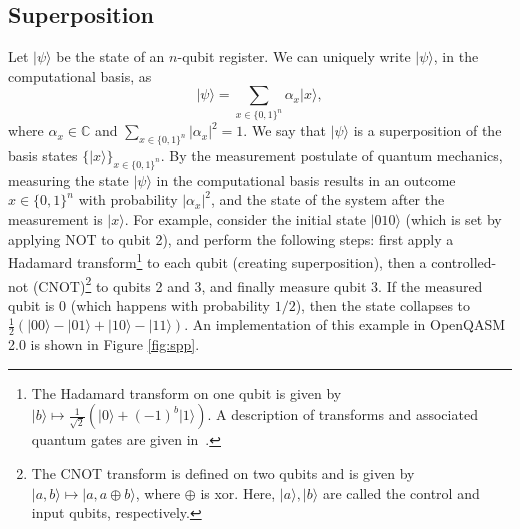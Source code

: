 \documentclass[11pt]{article}
\theoremstyle{plain}
\theoremstyle{definition}
\newcommand{\ldbrac}[1]{\lvert#1\rangle}
\newcommand{\abs}[1]{\left\vert#1\right\vert}
\def\C{\ensuremath{\mathbb{C}}}
\begin{document}
\subsection{Superposition}\label{sec:superposition}

Let $\ldbrac{\psi}$ be the state of an $n$-qubit register. We can uniquely write $\ldbrac{\psi}$, 
in 
the computational basis, as
\[ \ldbrac{\psi} = \sum_{x \in \{ 0, 1 \}^n} \alpha_x \ldbrac{x}, \]
where $\alpha_x \in \C$ and $\sum_{x \in \{ 0, 1 \}^n} \abs{\alpha_x}^2 = 1$. We say that 
$\ldbrac{\psi}$ is a superposition of the basis states $\{ \ldbrac{x} \}_{x \in \{ 0, 1 \}^n}$. By 
the measurement postulate of quantum mechanics, measuring the state $\ldbrac{\psi}$ in the 
computational basis results in an outcome $x \in \{ 0, 1 \}^n$ with probability $\abs{\alpha_x}^2$, 
and the state of the system after the measurement is $\ldbrac{x}$. For example, consider the 
initial state
$\ldbrac{010}$ (which is set by applying NOT to qubit 2), and perform the following steps: first 
apply a Hadamard transform\footnote{The Hadamard transform on one qubit is given by $\ldbrac{b} 
\mapsto \frac{1}{\sqrt{2}}(\ldbrac{0} + (-1)^b \ldbrac{1})$. A description of transforms and 
associated quantum gates are given in~\cite{kaye2007introduction}.} to each qubit (creating 
superposition), then
a controlled-not (CNOT)\footnote{The CNOT transform is defined on two qubits and is given by 
$\ldbrac{a, b} \mapsto \ldbrac{a, a \oplus b}$, where $\oplus$ is
xor. Here, $\ldbrac{a}, \ldbrac{b}$ are called the control and input qubits, respectively.} to 
qubits 2 and 3, and finally measure qubit 3. If the measured qubit is $0$ 
(which happens with probability $1/2$), then the state collapses to $\frac{1}{2}(\ldbrac{00} - 
\ldbrac{01} 
+ \ldbrac{10} - \ldbrac{11})$. An implementation of this example in OpenQASM 2.0 is shown in Figure 
\ref{fig:spp}.
\end{document}
